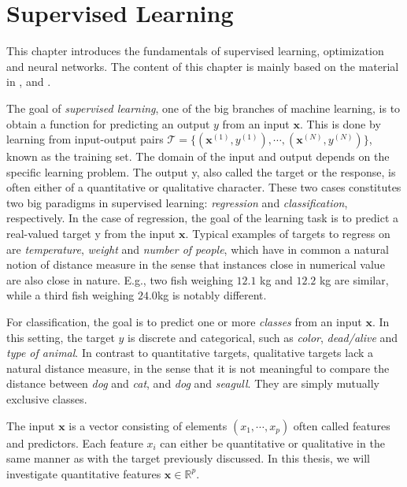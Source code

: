 \chapter{Supervised Learning}\label{chap:SupervisedLearning}

This chapter introduces the fundamentals of supervised learning, optimization and neural networks. The content of this chapter is mainly based on the material in \citet{SupervisedwquantumComputers}, \citet{hastie01statisticallearning} and \citet{nielsenneural}.

The goal of \emph{supervised learning}, one of the big branches of machine learning, is to obtain a function for predicting an output $y$ from an input $\boldsymbol{x}$. This is done by learning from input-output pairs $\mathcal{T} = \{(\boldsymbol{x}^{(1)}, y^{(1)}), \cdots, (\boldsymbol{x}^{(N)}, y^{(N)})\}$, known as the training set. The domain of the input and output depends on the specific learning problem. The output y, also called the target or the response, is often either of a quantitative or qualitative character. These two cases constitutes two big paradigms in supervised learning: \emph{regression} and \emph{classification}, respectively. In the case of regression, the goal of the learning task is to predict a real-valued target y from the input $\boldsymbol{x}$. Typical examples of targets to regress on are \emph{temperature}, \emph{weight} and \emph{number of people}, which have in common a natural notion of distance measure in the sense that instances close in numerical value are also close in nature. E.g., two fish weighing $12.1$ kg and $12.2$ kg are similar, while a third fish weighing $24.0$kg is notably different.

For classification, the goal is to predict one or more \emph{classes} from an input $\boldsymbol{x}$. In this setting, the target $y$ is discrete and categorical, such as \emph{color}, \emph{dead/alive} and \emph{type of animal}. In contrast to quantitative targets, qualitative targets lack a natural distance measure, in the sense that it is not meaningful to compare the distance between \emph{dog} and \emph{cat}, and \emph{dog} and \emph{seagull}. They are simply mutually exclusive classes.

The input $\boldsymbol{x}$ is a vector consisting of elements $(x_1, \cdots, x_p)$ often called features and predictors. Each feature $x_i$ can either be quantitative or qualitative in the same manner as with the target previously discussed. In this thesis, we will investigate quantitative features $\boldsymbol{x} \in \mathbb{R}^{p}$.


